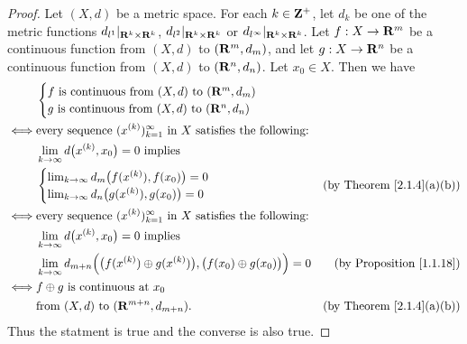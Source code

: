 \begin{proof}
    Let \((X, d)\) be a metric space.
    For each \(k \in \mathbf{Z}^+\), let \(d_k\) be one of the metric functions \(d_{l^1}|_{\mathbf{R}^k \times \mathbf{R}^k}\), \(d_{l^2}|_{\mathbf{R}^k \times \mathbf{R}^k}\) or \(d_{l^\infty}|_{\mathbf{R}^k \times \mathbf{R}^k}\).
    Let \(f : X \to \mathbf{R}^m\) be a continuous function from \((X, d)\) to \((\mathbf{R}^m, d_m)\), and let \(g : X \to \mathbf{R}^n\) be a continuous function from \((X, d)\) to \((\mathbf{R}^n, d_n)\).
    Let \(x_0 \in X\).
    Then we have
    \begin{align*}
             & \begin{cases}
                   f \text{ is continuous from } (X, d) \text{ to } (\mathbf{R}^m, d_m) \\
                   g \text{ is continuous from } (X, d) \text{ to } (\mathbf{R}^n, d_n)
               \end{cases}                                                                                              \\
        \iff & \text{every sequence } (x^{(k)})_{k = 1}^\infty \text{ in } X \text{ satisfies the following:}                                                            \\
             & \lim_{k \to \infty} d\big(x^{(k)}, x_0\big) = 0 \text{ implies }                                                                                          \\
             & \begin{cases}
                   \lim_{k \to \infty} d_m\big(f(x^{(k)}), f(x_0)\big) = 0 \\
                   \lim_{k \to \infty} d_n\big(g(x^{(k)}), g(x_0)\big) = 0
               \end{cases}                                                        & \text{(by Theorem \ref{2.1.4}(a)(b))}                                                \\
        \iff & \text{every sequence } (x^{(k)})_{k = 1}^\infty \text{ in } X \text{ satisfies the following:}                                                            \\
             & \lim_{k \to \infty} d\big(x^{(k)}, x_0\big) = 0 \text{ implies }                                                                                          \\
             & \lim_{k \to \infty} d_{m + n}\Big(\big(f(x^{(k)}) \oplus g(x^{(k)})\big), \big(f(x_0) \oplus g(x_0)\big)\Big) = 0 & \text{(by Proposition \ref{1.1.18})}  \\
        \iff & f \oplus g \text{ is continuous at } x_0                                                                                                                  \\
             & \text{from } (X, d) \text{ to } (\mathbf{R}^{m + n}, d_{m + n}).                                                          & \text{(by Theorem \ref{2.1.4}(a)(b))}
    \end{align*}
    Thus the statment is true and the converse is also true.
\end{proof}

